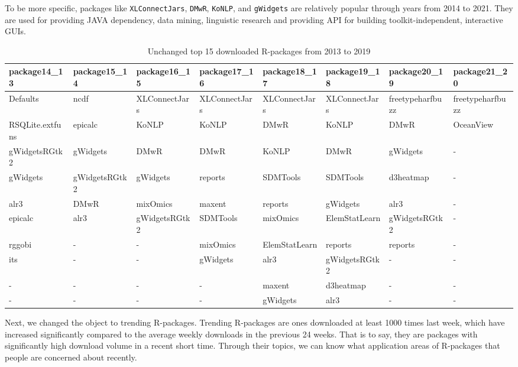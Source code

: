 \documentclass[
]{book}
\begin{document}
To be more specific, packages like \texttt{XLConnectJars}, \texttt{DMwR}, \texttt{KoNLP}, and \texttt{gWidgets} are relatively popular through years from 2014 to 2021. They are used for providing JAVA dependency, data mining, linguistic research and providing API for building toolkit-independent, interactive GUIs.

\begin{table}

\caption{\label{tab:unchanged-top15pkg}Unchanged top 15 downloaded R-packages from 2013 to 2019}
\centering
\begin{tabular}[t]{l|l|l|l|l|l|l|l}
\hline
package14\_13 & package15\_14 & package16\_15 & package17\_16 & package18\_17 & package19\_18 & package20\_19 & package21\_20\\
\hline
Defaults & ncdf & XLConnectJars & XLConnectJars & XLConnectJars & XLConnectJars & freetypeharfbuzz & freetypeharfbuzz\\
\hline
RSQLite.extfuns & epicalc & KoNLP & KoNLP & DMwR & KoNLP & DMwR & OceanView\\
\hline
gWidgetsRGtk2 & gWidgets & DMwR & DMwR & KoNLP & DMwR & gWidgets & -\\
\hline
gWidgets & gWidgetsRGtk2 & gWidgets & reports & SDMTools & SDMTools & d3heatmap & -\\
\hline
alr3 & DMwR & mixOmics & maxent & reports & gWidgets & alr3 & -\\
\hline
epicalc & alr3 & gWidgetsRGtk2 & SDMTools & mixOmics & ElemStatLearn & gWidgetsRGtk2 & -\\
\hline
rggobi & - & - & mixOmics & ElemStatLearn & reports & reports & -\\
\hline
its & - & - & gWidgets & alr3 & gWidgetsRGtk2 & - & -\\
\hline
- & - & - & - & maxent & d3heatmap & - & -\\
\hline
- & - & - & - & gWidgets & alr3 & - & -\\
\hline
\end{tabular}
\end{table}

Next, we changed the object to trending R-packages. Trending R-packages are ones downloaded at least 1000 times last week, which have increased significantly compared to the average weekly downloads in the previous 24 weeks\citep{r-hub}. That is to say, they are packages with significantly high download volume in a recent short time. Through their topics, we can know what application areas of R-packages that people are concerned about recently.
\end{document}
